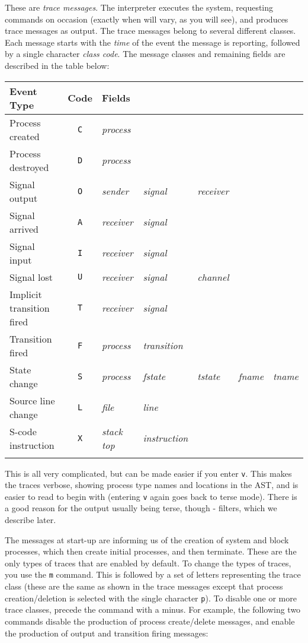These are {\em trace messages}. The interpreter executes the
system, requesting commands on occasion (exactly when will vary, 
as you will see), and produces trace messages as output. The
trace messages belong to several different classes. Each message
starts with the {\em time} of the event the message is reporting,
followed by a single character {\em class code}. The message classes
and remaining fields are described in the table below:

\small
\begin{tabular}{lclllll}\\
\hline
Event Type & Code & Fields &&&&\\
\hline
\hline
Process created & {\tt C} & {\em process} &&&&\\
Process destroyed & {\tt D} & {\em process} &&&&\\
\hline
Signal output & {\tt O} & {\em sender} & {\em signal} & {\em receiver} &&\\
Signal arrived & {\tt A} & {\em receiver} & {\em signal} &&&\\
Signal input & {\tt I} & {\em receiver} & {\em signal}& &&\\
Signal lost & {\tt U} & {\em receiver} & {\em signal} & {\em channel} &&\\
Implicit transition fired & {\tt T} & {\em receiver} & {\em signal} &&&\\
\hline
Transition fired & {\tt F} & {\em process} & {\em transition} &&&\\
State change & {\tt S} & {\em process} & {\em fstate} & {\em tstate} & {\em
fname} & {\em tname}\\
Source line change & {\tt L} & {\em file} & {\em line} &&&\\
S-code instruction & {\tt X} & {\em stack top} & {\em instruction} &&& \\
\hline\\
\end{tabular}
\normalsize

This is all very complicated, but can be made easier if you 
enter {\tt v}. This makes the traces verbose, showing process
type names and locations in the AST, and is easier to read to begin
with (entering {\tt v} again goes back to terse mode).
There is a good reason for the output usually being terse,
though - filters, which we describe later.

The messages at start-up are informing us of the 
creation of system and block processes, which then create initial 
processes, and then terminate. These are the only types of traces
that are enabled by default. To change the types of traces, you use
the {\tt m} command. This is followed by a set of letters
representing the trace class (these are the same as shown in the
trace messages except that process creation/deletion is selected
with the single character {\tt p}).
To disable one or more trace classes, precede the command with a minus.
For example, the following two commands disable the production of
process create/delete messages, and enable the production of output
and transition firing messages:

